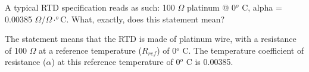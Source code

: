 

A typical RTD specification reads as such: 100 $\Omega$ platinum @ 0$^{o}$ C, alpha = 0.00385 $\Omega$/$\Omega \cdot ^{o}$C.  What, exactly, does this statement mean?







The statement means that the RTD is made of platinum wire, with a resistance of 100 $\Omega$ at a reference temperature ($R_{ref}$) of 0$^{o}$ C.  The temperature coefficient of resistance ($\alpha$) at this reference temperature of 0$^{o}$ C is 0.00385.











